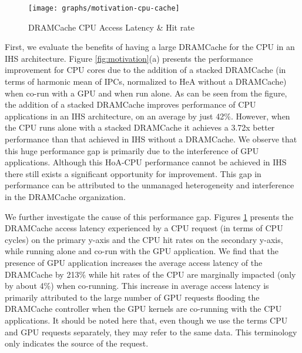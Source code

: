 \begin{figure}[htb]
   \centering
   \texttt{[image: graphs/motivation-cpu-cache]}
   \caption{DRAMCache CPU Access Latency \& Hit rate}
   \label{fig:motivation-cpu-cache}
\end{figure}
First, we evaluate the benefits of having a large DRAMCache for the CPU in an IHS architecture. Figure \ref{fig:motivation}(a) presents the performance improvement for CPU cores due to the addition of a stacked DRAMCache (in terms of harmonic mean of IPCs, normalized to HeA without a DRAMCache) when co-run with a GPU and when run alone.
As can be seen from the figure, the addition of a stacked DRAMCache improves performance of CPU applications in an IHS architecture, on an average by just 42\%. However, when the CPU runs alone with a stacked DRAMCache it achieves a 3.72x better performance than that achieved in IHS without a DRAMCache. 
We observe that this huge performance gap is primarily due to the interference of GPU applications.
Although this HoA-CPU performance cannot be achieved in IHS there still exists a significant opportunity for improvement.
This gap in performance can be attributed to the unmanaged heterogeneity and interference in the DRAMCache organization.
\par We further investigate the cause of this performance gap. Figures \ref{fig:motivation-cpu-cache} presents the DRAMCache access latency experienced by a CPU request (in terms of CPU cycles) on the primary y-axis and the CPU hit rates on the secondary y-axis, while running alone and co-run with the GPU application. We find that the presence of GPU application increases the average access latency of the DRAMCache by 213\% while hit rates of the CPU are marginally impacted (only by about 4\%) when co-running.
This increase in average access latency is primarily attributed to the large
number of GPU requests flooding the DRAMCache controller when the GPU kernels are co-running with the CPU applications.
It should be noted here that, even though we use the terms CPU and GPU requests separately, they may refer to the same data. This terminology only indicates the source of the request. 
